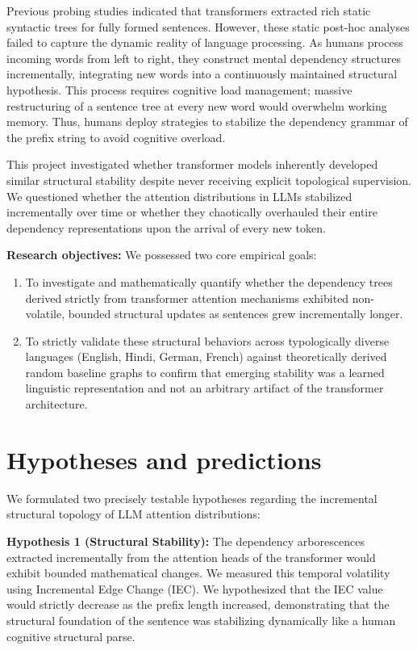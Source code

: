 \documentclass[11pt,a4paper]{article}
\begin{document}
Previous probing studies indicated that transformers extracted rich static syntactic trees for fully formed sentences. However, these static post-hoc analyses failed to capture the dynamic reality of language processing. As humans process incoming words from left to right, they construct mental dependency structures incrementally, integrating new words into a continuously maintained structural hypothesis. This process requires cognitive load management; massive restructuring of a sentence tree at every new word would overwhelm working memory. Thus, humans deploy strategies to stabilize the dependency grammar of the prefix string to avoid cognitive overload.

This project investigated whether transformer models inherently developed similar structural stability despite never receiving explicit topological supervision. We questioned whether the attention distributions in LLMs stabilized incrementally over time or whether they chaotically overhauled their entire dependency representations upon the arrival of every new token.

\textbf{Research objectives:} We possessed two core empirical goals:
\begin{enumerate}
    \item To investigate and mathematically quantify whether the dependency trees derived strictly from transformer attention mechanisms exhibited non-volatile, bounded structural updates as sentences grew incrementally longer.
    \item To strictly validate these structural behaviors across typologically diverse languages (English, Hindi, German, French) against theoretically derived random baseline graphs to confirm that emerging stability was a learned linguistic representation and not an arbitrary artifact of the transformer architecture.
\end{enumerate}

\section{Hypotheses and predictions}

We formulated two precisely testable hypotheses regarding the incremental structural topology of LLM attention distributions:

\textbf{Hypothesis 1 (Structural Stability):} The dependency arborescences extracted incrementally from the attention heads of the transformer would exhibit bounded mathematical changes. We measured this temporal volatility using Incremental Edge Change (IEC). We hypothesized that the IEC value would strictly decrease as the prefix length increased, demonstrating that the structural foundation of the sentence was stabilizing dynamically like a human cognitive structural parse.
\end{document}
